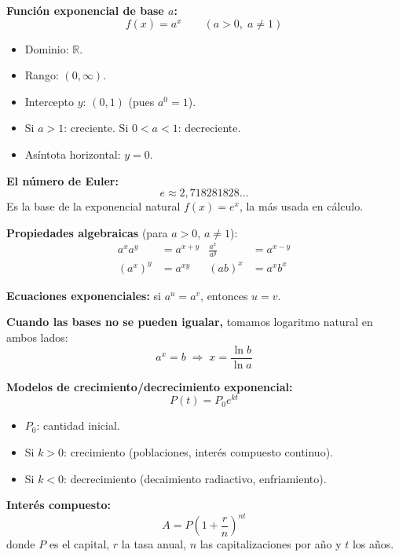 \documentclass[12pt, letterpaper]{article}
\begin{document}
\begin{cuadroteoria}
  \textbf{Función exponencial de base $a$:}
  $$f(x) = a^x \qquad (a > 0,\; a \neq 1)$$
  \begin{itemize}[leftmargin=*]
    \item Dominio: $\mathbb{R}$.
    \item Rango: $(0, \infty)$.
    \item Intercepto $y$: $(0, 1)$ (pues $a^0 = 1$).
    \item Si $a > 1$: creciente. Si $0 < a < 1$: decreciente.
    \item Asíntota horizontal: $y = 0$.
  \end{itemize}

  \textbf{El número de Euler:}
  $$e \approx 2{,}718281828{\dots}$$
  Es la base de la exponencial natural $f(x) = e^x$, la más usada en cálculo.
\end{cuadroteoria}
\newpage
\begin{cuadrosolucion}
  \textbf{Propiedades algebraicas} (para $a > 0$, $a \neq 1$):
  \begin{align*}
    a^x a^y & = a^{x+y} & \frac{a^x}{a^y} & = a^{x-y} \\
    (a^x)^y & = a^{xy}  & (ab)^x          & = a^x b^x
  \end{align*}

  \textbf{Ecuaciones exponenciales:} si $a^u = a^v$, entonces $u = v$.

  \textbf{Cuando las bases no se pueden igualar,} tomamos logaritmo natural en ambos lados:
  $$a^x = b \;\Longrightarrow\; x = \frac{\ln b}{\ln a}$$
\end{cuadrosolucion}

\begin{cuadroadvertencia}
  \textbf{Modelos de crecimiento/decrecimiento exponencial:}
  $$P(t) = P_0 e^{kt}$$
  \begin{itemize}[leftmargin=*]
    \item $P_0$: cantidad inicial.
    \item Si $k > 0$: crecimiento (poblaciones, interés compuesto continuo).
    \item Si $k < 0$: decrecimiento (decaimiento radiactivo, enfriamiento).
  \end{itemize}

  \textbf{Interés compuesto:}
  $$A = P\left(1 + \frac{r}{n}\right)^{nt}$$
  donde $P$ es el capital, $r$ la tasa anual, $n$ las capitalizaciones por año y $t$ los años.
\end{cuadroadvertencia}
\end{document}
